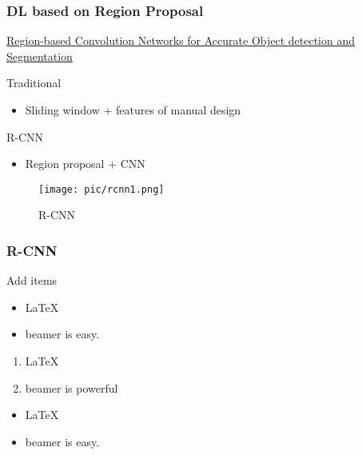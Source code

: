 \documentclass{beamer}
\begin{document}
\begin{frame}
  \frametitle{DL based on Region Proposal}
  \href{https://people.eecs.berkeley.edu/~rbg/papers/pami/rcnn_pami.pdf}
  {Region-based Convolution Networks for Accurate Object detection and Segmentation}
  \begin{block}{Traditional}
    \begin{itemize}
    \item Sliding window + features of manual design 
    \end{itemize}
  \end{block}
  \begin{block}{R-CNN}
    \begin{itemize}
    \item Region proposal + CNN
    \end{itemize}
  \end{block}
  \begin{figure}[!t]
    \centering
    \texttt{[image: pic/rcnn1.png]}
    \caption{R-CNN}
  \end{figure}

\end{frame}

\begin{frame}
  \frametitle{R-CNN}
  
  
\end{frame}




\begin{frame}
  Add items
  \begin{itemize}
  \item \LaTeX{}
  \item beamer is easy.
  \end{itemize}

  \begin{enumerate}
  \item \LaTeX{}
  \item beamer is powerful
  \end{enumerate}
\end{frame}

\begin{frame}

  \begin{example}
    \begin{itemize}
    \item \LaTeX{}
    \item beamer is easy.
    \end{itemize}    
  \end{example}
\end{frame}
\end{document}
